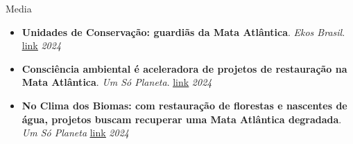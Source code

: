 \documentclass{resume}
\begin{document}
\begin{rSection}{Media}
\begin{itemize}
\item {\bf Unidades de Conservação: guardiãs da Mata Atlântica}. {\it Ekos Brasil}. \href{https://www.ekosbrasil.org/unidades-de-conservacao-guardias-da-mata-atlantica}{\underline{link}} \hfill{\em 2024}
\item {\bf Consciência ambiental é aceleradora de projetos de restauração na Mata Atlântica}. {\it Um Só Planeta}. \href{https://umsoplaneta.globo.com/clima/noticia/2024/09/26/consciencia-ambiental-e-aceleradora-de-projetos-de-restauracao-na-mata-atlantica.ghtml}{\underline{link}} \hfill{\em 2024}
\item {\bf No Clima dos Biomas: com restauração de florestas e nascentes de água, projetos buscam recuperar uma Mata Atlântica degradada}. {\it Um Só Planeta} \href{https://umsoplaneta.globo.com/clima/noticia/2024/09/26/no-clima-dos-biomas-com-restauracao-de-florestas-e-nascentes-de-agua-projetos-buscam-recuperar-uma-mata-atlantica-degradada.ghtml}{\underline{link}} \hfill{\em 2024}
\end{itemize} 


\end{rSection}
\end{document}
